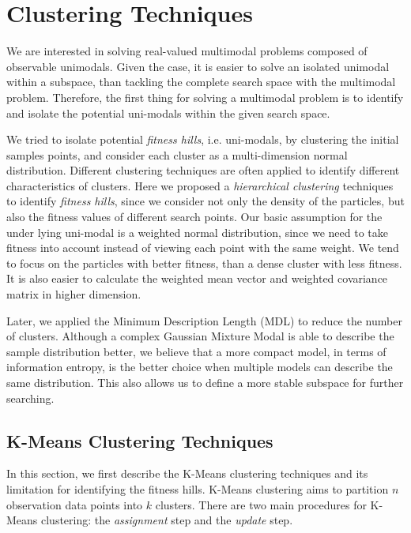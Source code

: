 \chapter{Clustering Techniques}
\label{chapter:clustering}

We are interested in solving real-valued multimodal problems composed of observable unimodals.
Given the case, it is easier to solve an isolated unimodal within a subspace,
than tackling the complete search space with the multimodal problem.
Therefore, the first thing for solving a multimodal problem is to identify and isolate 
the potential uni-modals within the given search space.

We tried to isolate potential \textit{fitness hills}, i.e. uni-modals,
by clustering the initial samples points,
and consider each cluster as a multi-dimension normal distribution.
Different clustering techniques are often applied to identify different characteristics of clusters.
Here we proposed a \textit{hierarchical clustering} techniques to identify \textit{fitness hills},
since we consider not only the density of the particles,
but also the fitness values of different search points.
Our basic assumption for the under lying uni-modal is a weighted normal distribution, 
since we need to take fitness into account instead of viewing each point with the same weight.
We tend to focus on the particles with better fitness,
than a dense cluster with less fitness. 
It is also easier to calculate the weighted mean vector and weighted covariance matrix in higher dimension. 

Later, we applied the Minimum Description Length (MDL) to reduce the number of clusters.
Although a complex Gaussian Mixture Modal is able to describe the sample distribution better,
we believe that a more compact model, in terms of information entropy, is the better choice 
when multiple models can describe the same distribution. 
This also allows us to define a more stable subspace for further searching.


\section{K-Means Clustering Techniques}
In this section, we first describe the K-Means clustering techniques and its limitation for identifying the fitness hills.
K-Means clustering aims to partition $n$ observation data points into $k$ clusters.
There are two main procedures for K-Means clustering: the \textit{assignment} step and the \textit{update} step.

